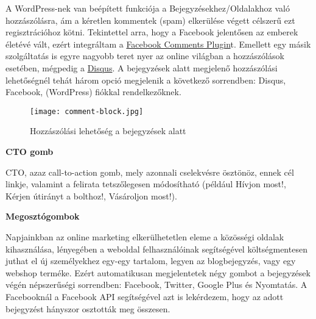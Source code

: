 A WordPress-nek van beépített funkciója a Bejegyzésekhez/Oldalakhoz való hozzászólásra, ám a kéretlen kommentek (spam) elkerülése végett célszerű ezt regisztrációhoz kötni. Tekintettel arra, hogy a Facebook jelentősen az emberek életévé vált, ezért integráltam a \href{https://developers.facebook.com/docs/plugins/comments/}{Facebook Comments Plugin}t. Emellett egy másik szolgáltatás is egyre nagyobb teret nyer az online világban a hozzászólások esetében, mégpedig a \href{https://disqus.com/}{Disqus}. A bejegyzések alatt megjelenő hozzászólási lehetőségnél tehát három opció megjelenik a következő sorrendben: Disqus, Facebook, (WordPress) fiókkal rendelkezőknek.

\begin{figure}
	\texttt{[image: comment-block.jpg]}
	\caption{Hozzászólási lehetőség a bejegyzések alatt}
\end{figure}


\tab\textbf{CTO gomb}

CTO, azaz call-to-action gomb, mely azonnali cselekvésre ösztönöz, ennek cél linkje, valamint a felirata tetszőlegesen módosítható (például Hívjon most!, Kérjen útirányt a bolthoz!, Vásároljon most!).

\newpage

\textbf{Megosztógombok}

Napjainkban az online marketing elkerülhetetlen eleme a közösségi oldalak kihasználása, lényegében a weboldal felhasználóinak segítségével költségmentesen juthat el új személyekhez egy-egy tartalom, legyen az blogbejegyzés, vagy egy webshop terméke. Ezért automatikusan megjelentetek négy gombot a bejegyzések végén népszerűségi sorrendben: Facebook, Twitter, Google Plus és Nyomtatás. A Facebooknál a Facebook API segítségével azt is lekérdezem, hogy az adott bejegyzést hányszor osztották meg összesen.

